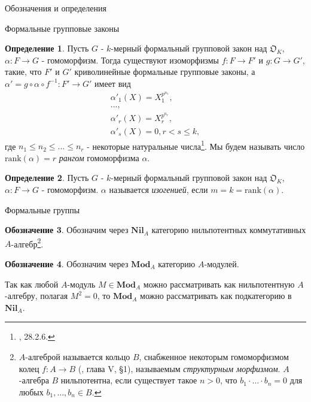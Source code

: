 \documentclass[a4paper,14pt]{extarticle}
\theoremstyle{definition}
\newtheorem{definition}{Определение}[section]
\newtheorem{denotation}[definition]{Обозначение}
\newcommand{\Mod}[1]{\mathbf{Mod}_{#1}}
\newcommand{\Nil}[1]{\mathbf{Nil}_{#1}}
\newcommand{\rank}[1]{\mathrm{rank}\left(#1\right)}
\newcommand{\fO}{\mathfrak{O}}
\begin{document}
\begin{section}{Обозначения и определения}
\begin{subsection}{Формальные групповые законы}
\begin{definition}\label{def:2.5:rank_of_hom}
    Пусть $G$ - $k$-мерный формальный групповой закон над $\fO_K$, ${ \alpha : F \rightarrow G }$ - гомоморфизм. Тогда существуют изоморфизмы ${ f : F \rightarrow F' }$ и ${ g : G \rightarrow G' }$, такие, что $F'$ и $G'$ криволинейные формальные групповые законы, а ${ \alpha' = g \circ \alpha \circ f^{-1} : F' \rightarrow G' }$ имеет вид
    \begin{gather*}
        \alpha'_1(X) = X_1^{p^{n_1}}, \\
        ..., \\
        \alpha'_r(X) = X_r^{p^{n_r}}, \\
        \alpha'_s(X) = 0, r < s \leq k,
    \end{gather*}
    где ${ n_1 \leq n_2 \leq ... \leq n_r }$ - некоторые натуральные числа\footnote{
        \cite{Hazewinkel}, 28.2.6.
    }. Мы будем называть число ${ \rank{\alpha} = r }$ \textit{рангом} гомоморфизма $\alpha$.
\end{definition}

\begin{definition}\label{def:2.6:isogeny}
    Пусть $G$ - $k$-мерный формальный групповой закон над $\fO_K$, ${ \alpha : F \rightarrow G }$ - гомоморфизм. $\alpha$ называется \textit{изогенией}, если ${ m = k = \rank{\alpha} }$.
\end{definition}

\end{subsection}

\begin{subsection}{Формальные группы}

\begin{denotation}\label{denote:3.0:Nil_A}
    Обозначим через $\Nil{A}$ категорию нильпотентных коммутативных $A$-алгебр\footnote{
        $A$-алгеброй называется кольцо $B$, снабженное некоторым гомоморфизмом колец ${ f : A \rightarrow B }$ (\cite{Lang}, глава V, \S 1), называемым \textit{структурным морфизмом}. $A$-алгебра $B$ нильпотентна, если существует такое ${ n > 0 }$, что ${ b_1 \cdot ... \cdot b_n = 0 }$ для любых ${ b_1, ..., b_n \in B }$.
    }.
\end{denotation}

\begin{denotation}\label{denote:3.1:Mod_A}
    Обозначим через $\Mod{A}$ категорию $A$-модулей.

    Так как любой $A$-модуль ${ M \in \Mod{A} }$ можно рассматривать как нильпотентную $A$-алгебру, полагая ${ M^2 = 0 }$, то $\Mod{A}$ можно рассматривать как подкатегорию в $\Nil{A}$.
\end{denotation}


\end{subsection}
\end{section}
\end{document}
